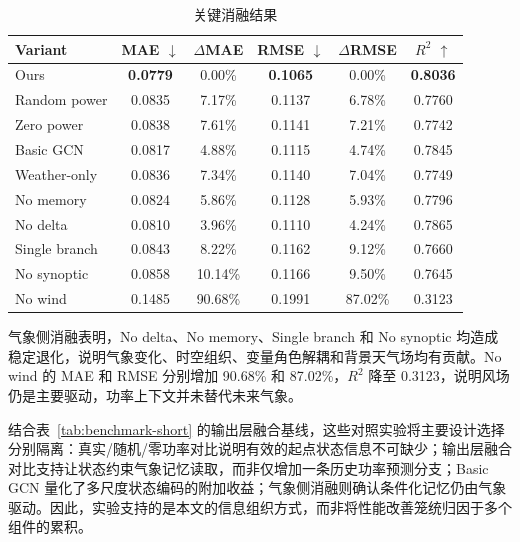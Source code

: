 \begin{table}[htbp]
\caption{关键消融结果}
\begin{center}
\footnotesize
\setlength{\tabcolsep}{2pt}
\begin{tabular}{lccccc}
\hline
Variant & MAE \(\downarrow\) & \(\Delta\)MAE & RMSE \(\downarrow\) & \(\Delta\)RMSE & \(R^2\) \(\uparrow\) \\
\hline
Ours & \textbf{0.0779} & 0.00\% & \textbf{0.1065} & 0.00\% & \textbf{0.8036} \\
Random power & 0.0835 & 7.17\% & 0.1137 & 6.78\% & 0.7760 \\
Zero power & 0.0838 & 7.61\% & 0.1141 & 7.21\% & 0.7742 \\
Basic GCN & 0.0817 & 4.88\% & 0.1115 & 4.74\% & 0.7845 \\
Weather-only & 0.0836 & 7.34\% & 0.1140 & 7.04\% & 0.7749 \\
No memory & 0.0824 & 5.86\% & 0.1128 & 5.93\% & 0.7796 \\
No delta & 0.0810 & 3.96\% & 0.1110 & 4.24\% & 0.7865 \\
Single branch & 0.0843 & 8.22\% & 0.1162 & 9.12\% & 0.7660 \\
No synoptic & 0.0858 & 10.14\% & 0.1166 & 9.50\% & 0.7645 \\
No wind & 0.1485 & 90.68\% & 0.1991 & 87.02\% & 0.3123 \\
\hline
\end{tabular}
\label{tab:ablation-short}
\end{center}
\end{table}

气象侧消融表明，No delta、No memory、Single branch 和 No synoptic 均造成稳定退化，说明气象变化、时空组织、变量角色解耦和背景天气场均有贡献。No wind 的 MAE 和 RMSE 分别增加 90.68\% 和 87.02\%，\(R^2\) 降至 0.3123，说明风场仍是主要驱动，功率上下文并未替代未来气象。

结合表~\ref{tab:benchmark-short} 的输出层融合基线，这些对照实验将主要设计选择分别隔离：真实/随机/零功率对比说明有效的起点状态信息不可缺少；输出层融合对比支持让状态约束气象记忆读取，而非仅增加一条历史功率预测分支；Basic GCN 量化了多尺度状态编码的附加收益；气象侧消融则确认条件化记忆仍由气象驱动。因此，实验支持的是本文的信息组织方式，而非将性能改善笼统归因于多个组件的累积。
